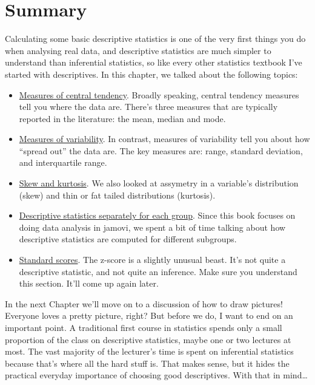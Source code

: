 \documentclass[
]{book}
\providecommand{\tightlist}{%
  \setlength{\itemsep}{0pt}\setlength{\parskip}{0pt}}
\begin{document}
\hypertarget{summary-2}{%
\section{Summary}\label{summary-2}}

Calculating some basic descriptive statistics is one of the very first things you do when analysing real data, and descriptive statistics are much simpler to understand than inferential statistics, so like every other statistics textbook I've started with descriptives. In this chapter, we talked about the following topics:

\begin{itemize}
\tightlist
\item
  \protect\hyperlink{measures-of-central-tendency}{Measures of central tendency}. Broadly speaking, central tendency measures tell you where the data are. There's three measures that are typically reported in the literature: the mean, median and mode.
\item
  \protect\hyperlink{measures-of-variability}{Measures of variability}. In contrast, measures of variability tell you about how ``spread out'' the data are. The key measures are: range, standard deviation, and interquartile range.
\item
  \protect\hyperlink{skew-and-kurtosis}{Skew and kurtosis}. We also looked at assymetry in a variable's distribution (skew) and thin or fat tailed distributions (kurtosis).
\item
  \protect\hyperlink{descriptive-statistics-separately-for-each-group}{Descriptive statistics separately for each group}. Since this book focuses on doing data analysis in jamovi, we spent a bit of time talking about how descriptive statistics are computed for different subgroups.
\item
  \protect\hyperlink{standard-scores}{Standard scores}. The z-score is a slightly unusual beast. It's not quite a descriptive statistic, and not quite an inference. Make sure you understand this section. It'll come up again later.
\end{itemize}

In the next Chapter we'll move on to a discussion of how to draw pictures! Everyone loves a pretty picture, right? But before we do, I want to end on an important point. A traditional first course in statistics spends only a small proportion of the class on descriptive statistics, maybe one or two lectures at most. The vast majority of the lecturer's time is spent on inferential statistics because that's where all the hard stuff is. That makes sense, but it hides the practical everyday importance of choosing good descriptives. With that in mind\ldots{}
\end{document}
